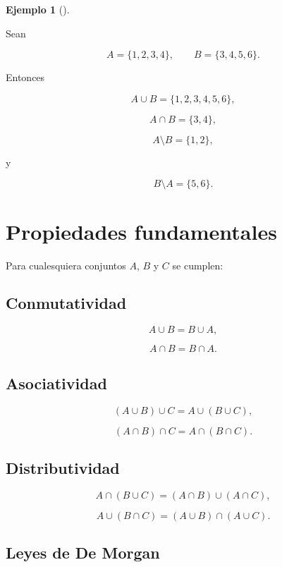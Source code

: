 \documentclass[
  spanish,
  11pt,
  letterpaper,
  DIV=11,
  numbers=noendperiod]{scrreprt}
\theoremstyle{definition}
\theoremstyle{plain}
\theoremstyle{definition}
\newtheorem{example}{Ejemplo}[chapter]
\theoremstyle{remark}
\begin{document}
\begin{example}[]\protect\hypertarget{exm-operaciones-conjuntos}{}\label{exm-operaciones-conjuntos}

Sean

\[
A=\{1,2,3,4\},
\qquad
B=\{3,4,5,6\}.
\]

Entonces

\[
A\cup B=\{1,2,3,4,5,6\},
\]

\[
A\cap B=\{3,4\},
\]

\[
A\setminus B=\{1,2\},
\]

y

\[
B\setminus A=\{5,6\}.
\]

\end{example}

\section{Propiedades fundamentales}\label{propiedades-fundamentales}

Para cualesquiera conjuntos \(A\), \(B\) y \(C\) se cumplen:

\subsection{Conmutatividad}\label{conmutatividad}

\[
A\cup B=B\cup A,
\]

\[
A\cap B=B\cap A.
\]

\subsection{Asociatividad}\label{asociatividad}

\[
(A\cup B)\cup C=A\cup(B\cup C),
\]

\[
(A\cap B)\cap C=A\cap(B\cap C).
\]

\subsection{Distributividad}\label{distributividad}

\[
A\cap(B\cup C)
=
(A\cap B)\cup(A\cap C),
\]

\[
A\cup(B\cap C)
=
(A\cup B)\cap(A\cup C).
\]

\subsection{Leyes de De Morgan}\label{leyes-de-de-morgan}
\end{document}
